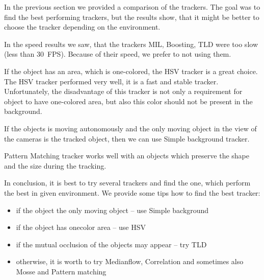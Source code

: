 In the previous section we provided a comparison of the trackers. The goal was
to find the best performing trackers, but the results show, that it might be
better to choose the tracker depending on the environment.

In the speed results we saw, that the trackers MIL, Boosting, TLD were too slow
(less than 30~FPS). Because of their speed, we prefer to not using them.

If the object has an area, which is one-colored, the HSV tracker is a great choice.
The HSV tracker performed very well, it is a fast and stable tracker.
Unfortunately, the disadvantage of this tracker is not only a requirement for
object to have one-colored area, but also this color should not be present in
the background.

If the objects is moving autonomously and the only moving object in the view of
the cameras is the tracked object, then we can use Simple background tracker.

Pattern Matching tracker works well with an objects which preserve the shape
and the size during the tracking.

In conclusion, it is best to try several trackers and find the one, which
perform the best in given environment. We provide some tips how to find the
best tracker:
\begin{itemize}
\item if the object the only moving object -- use Simple background
\item if the object has onecolor area -- use HSV
\item if the mutual occlusion of the objects may appear -- try TLD
\item otherwise, it is worth to try Medianflow, Correlation and sometimes also Mosse and Pattern matching
\end{itemize}

